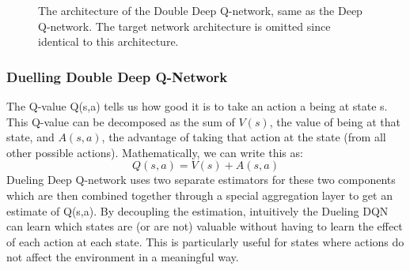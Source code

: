 \documentclass[14pt]{extarticle}
\def\sp{\vspace{5pt}}
\begin{document}
\begin{flushleft}
\begin{figure}[H]
\begin{center}
	    		\caption{The architecture of the Double Deep Q-network, same as the Deep Q-network. The target network architecture is omitted since identical to this architecture.}
\end{center}
\end{figure}

	\subsubsection{Duelling Double Deep Q-Network}
	\sp
	The Q-value Q(s,a) tells us how good it is to take an action a being at state s. This Q-value can be decomposed as the sum of $V(s)$, the value of being at that state, and $A(s,a)$, the advantage of taking that action at the state (from all other possible actions). Mathematically, we can write this as:
	\[ Q(s,a) = V(s) + A(s,a)\]
Dueling Deep Q-network uses two separate estimators for these two components which are then combined together through a special aggregation layer to get an estimate of Q(s,a). By decoupling the estimation, intuitively the Dueling DQN can learn which states are (or are not) valuable without having to learn the effect of each action at each state. This is particularly useful for states where actions do not affect the environment in a meaningful way. \cite{DDQN2} %
	

\end{flushleft}
\end{document}
